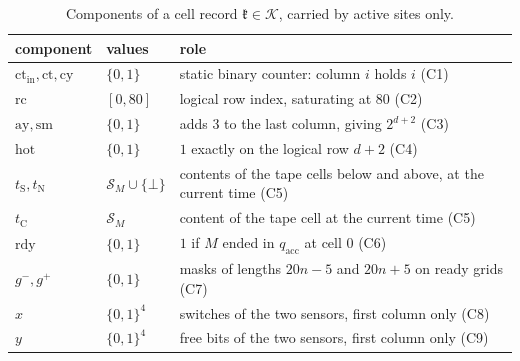 \begin{table}[ht]
\centering
\small
\begin{tabularx}{\textwidth}{@{}l>{\raggedright\arraybackslash}p{2.6cm}>{\raggedright\arraybackslash}X@{}}
\toprule
component & values & role\\
\midrule
$\mathrm{ct}_{\mathrm{in}},\mathrm{ct},\mathrm{cy}$ & $\{0,1\}$ & static binary counter: column $i$ holds $i$ (C1)\\
$\mathrm{rc}$ & $[0,80]$ & logical row index, saturating at $80$ (C2)\\
$\mathrm{ay},\mathrm{sm}$ & $\{0,1\}$ & adds $3$ to the last column, giving $2^{d+2}$ (C3)\\
$\mathrm{hot}$ & $\{0,1\}$ & $1$ exactly on the logical row $d+2$ (C4)\\
$t_{\mathrm S},t_{\mathrm N}$ & $\mathcal S_M\cup\{\bot\}$ & contents of the tape cells below and above, at the current time (C5)\\
$t_{\mathrm C}$ & $\mathcal S_M$ & content of the tape cell at the current time (C5)\\
$\mathrm{rdy}$ & $\{0,1\}$ & $1$ if $M$ ended in $q_{\mathrm{acc}}$ at cell $0$ (C6)\\
$g^-,g^+$ & $\{0,1\}$ & masks of lengths $20n-5$ and $20n+5$ on ready grids (C7)\\
$x$ & $\{0,1\}^4$ & switches of the two sensors, first column only (C8)\\
$y$ & $\{0,1\}^4$ & free bits of the two sensors, first column only (C9)\\
\bottomrule
\end{tabularx}
\caption{Components of a cell record $\mathfrak k\in\mathcal K$, carried by active sites only.}
\label{tab:cells}
\end{table}

